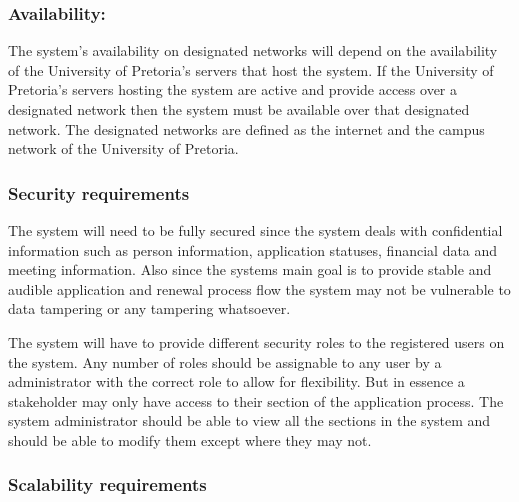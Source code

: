\documentclass[12pt]{article}
\begin{document}
\subsubsection{Availability:}

\begin{flushleft}

The system's availability on designated networks will depend on the availability of the University of Pretoria's servers that host the system. If the University of Pretoria's servers hosting the system are active and provide access over a designated network then the system must be available over that designated network. The designated networks are defined as the internet and the campus network of the University of Pretoria.

\end{flushleft}

\vspace{0.1in}

\subsubsection{Security requirements}

\begin{flushleft}

The system will need to be fully secured since the system deals with confidential information such as person information, application statuses, financial data and meeting information. Also since the systems main goal is to provide stable and audible application and renewal process flow the system may not be vulnerable to data tampering or any tampering whatsoever. \\
\vspace{0.1in}

The system will have to provide different security roles to the registered users on the system. Any number of roles should be assignable to any user by a administrator with the correct role to allow for flexibility.
But in essence a stakeholder may only have access to their section of the application process. The system administrator should be able to view all the sections in the system and should be able to modify them except where they may not.

\end{flushleft}

\vspace{0.1in}

\subsubsection{Scalability requirements}
\end{document}
